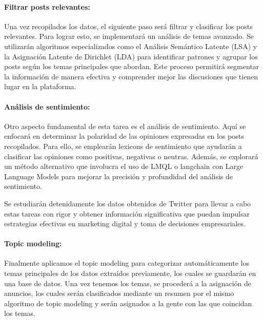 \documentclass[
  letterpaper,
  DIV=11,
  numbers=noendperiod]{scrartcl}
\let\oldparagraph\paragraph
\renewcommand{\paragraph}[1]{\oldparagraph{#1}\mbox{}}
\begin{document}
\paragraph{Filtrar posts relevantes:}\label{filtrar-posts-relevantes}

Una vez recopilados los datos, el siguiente paso será filtrar y
clasificar los posts relevantes. Para lograr esto, se implementará un
análisis de temas avanzado. Se utilizarán algoritmos especializados como
el Análisis Semántico Latente (LSA) y la Asignación Latente de Dirichlet
(LDA) para identificar patrones y agrupar los posts según los temas
principales que abordan. Este proceso permitirá segmentar la información
de manera efectiva y comprender mejor las discusiones que tienen lugar
en la plataforma.

\paragraph{Análisis de sentimiento:}\label{anuxe1lisis-de-sentimiento}

Otro aspecto fundamental de esta tarea es el análisis de sentimiento.
Aquí se enfocará en determinar la polaridad de las opiniones expresadas
en los posts recopilados. Para ello, se emplearán lexicons de
sentimiento que ayudarán a clasificar las opiniones como positivas,
negativas o neutras. Además, se explorará un método alternativo que
involucra el uso de LMQL o langchain con Large Language Models para
mejorar la precisión y profundidad del análisis de sentimiento.

Se estudiarán detenidamente los datos obtenidos de Twitter para llevar a
cabo estas tareas con rigor y obtener información significativa que
puedan impulsar estrategias efectivas en marketing digital y toma de
decisiones empresariales.

\paragraph{Topic modeling:}\label{topic-modeling}

Finalmente aplicamos el topic modeling para categorizar automáticamente
los temas principales de los datos extraídos previamente, los cuales se
guardarán en una base de datos. Una vez tenemos los temas, se procederá
a la asignación de anuncios, los cuales serán clasificados mediante un
resumen por el mismo algoritmo de topic modeling y serán asignados a la
gente con las que coincidan los temas.

\newpage{}
\end{document}
